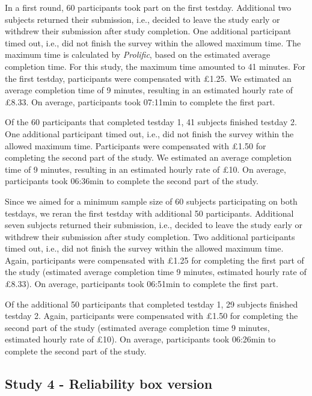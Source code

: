 \documentclass[
  man,floatsintext]{apa6}
\begin{document}
In a first round, 60 participants took part on the first testday.
Additional two subjects returned their submission, i.e., decided to leave the study early or withdrew their submission after study completion.
One additional participant timed out, i.e., did not finish the survey within the allowed maximum time.
The maximum time is calculated by \emph{Prolific}, based on the estimated average completion time.
For this study, the maximum time amounted to 41 minutes.
For the first testday, participants were compensated with £1.25.
We estimated an average completion time of 9 minutes, resulting in an estimated hourly rate of £8.33.
On average, participants took 07:11min to complete the first part.

Of the 60 participants that completed testday 1, 41 subjects finished testday 2.
One additional participant timed out, i.e., did not finish the survey within the allowed maximum time.
Participants were compensated with £1.50 for completing the second part of the study.
We estimated an average completion time of 9 minutes, resulting in an estimated hourly rate of £10.
On average, participants took 06:36min to complete the second part of the study.

Since we aimed for a minimum sample size of 60 subjects participating on both testdays, we reran the first testday with additional 50 participants.
Additional seven subjects returned their submission, i.e., decided to leave the study early or withdrew their submission after study completion.
Two additional participants timed out, i.e., did not finish the survey within the allowed maximum time.
Again, participants were compensated with £1.25 for completing the first part of the study (estimated average completion time 9 minutes, estimated hourly rate of £8.33).
On average, participants took 06:51min to complete the first part.

Of the additional 50 participants that completed testday 1, 29 subjects finished testday 2.
Again, participants were compensated with £1.50 for completing the second part of the study (estimated average completion time 9 minutes, estimated hourly rate of £10).
On average, participants took 06:26min to complete the second part of the study.

\hypertarget{study-4---reliability-box-version}{%
\subsection{Study 4 - Reliability box version}\label{study-4---reliability-box-version}}
\end{document}
